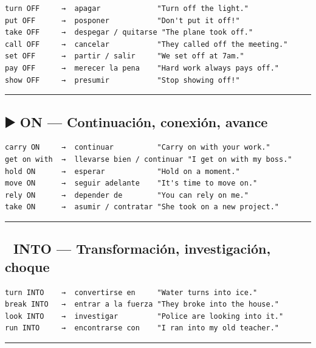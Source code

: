 \documentclass[
  spanish,
  letterpaper,
]{scrbook}
\begin{document}
\begin{verbatim}
turn OFF     →  apagar             "Turn off the light."
put OFF      →  posponer           "Don't put it off!"
take OFF     →  despegar / quitarse "The plane took off."
call OFF     →  cancelar           "They called off the meeting."
set OFF      →  partir / salir     "We set off at 7am."
pay OFF      →  merecer la pena    "Hard work always pays off."
show OFF     →  presumir           "Stop showing off!"
\end{verbatim}

\begin{center}\rule{0.5\linewidth}{0.5pt}\end{center}

\subsection{▶️ ON --- Continuación, conexión,
avance}\label{on-continuaciuxf3n-conexiuxf3n-avance}

\begin{verbatim}
carry ON     →  continuar          "Carry on with your work."
get on with  →  llevarse bien / continuar "I get on with my boss."
hold ON      →  esperar            "Hold on a moment."
move ON      →  seguir adelante    "It's time to move on."
rely ON      →  depender de        "You can rely on me."
take ON      →  asumir / contratar "She took on a new project."
\end{verbatim}

\begin{center}\rule{0.5\linewidth}{0.5pt}\end{center}

\subsection{🔄 INTO --- Transformación, investigación,
choque}\label{into-transformaciuxf3n-investigaciuxf3n-choque}

\begin{verbatim}
turn INTO    →  convertirse en     "Water turns into ice."
break INTO   →  entrar a la fuerza "They broke into the house."
look INTO    →  investigar         "Police are looking into it."
run INTO     →  encontrarse con    "I ran into my old teacher."
\end{verbatim}

\begin{center}\rule{0.5\linewidth}{0.5pt}\end{center}
\end{document}
